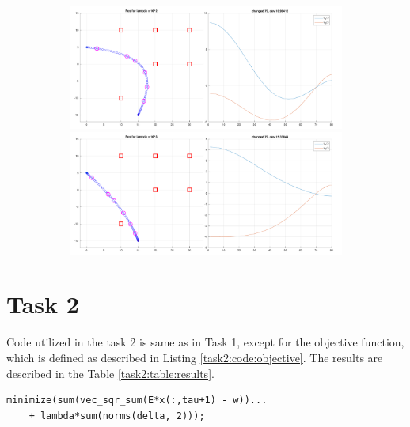 \begin{figure}[!htb]
\begin{subfigure}
\end{subfigure}
\begin{subfigure}
    \centering
    \includegraphics[width=0.5\linewidth]{part1/figures/task1/1_2.pdf}\hspace{0em}
    \includegraphics[width=0.5\linewidth]{part1/figures/task1/1_3.pdf}
\end{subfigure}
\end{figure}

\section{Task 2}
Code utilized in the task 2 is same as in Task 1, except for the objective function, which is defined as described in Listing \ref{task2:code:objective}. The results are described in the Table \ref{task2:table:results}.

\begin{lstlisting}[label=task2:code:objective, caption=Objective function used in Task 2., float=!htb]
minimize(sum(vec_sqr_sum(E*x(:,tau+1) - w))...
    + lambda*sum(norms(delta, 2)));
\end{lstlisting}

